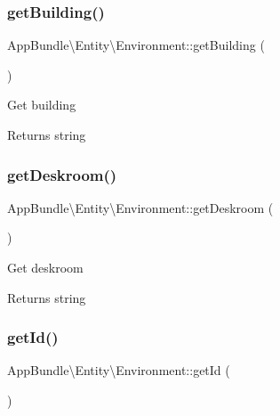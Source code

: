 \subsubsection{\texorpdfstring{get\+Building()}{getBuilding()}}
{\footnotesize\ttfamily App\+Bundle\textbackslash{}\+Entity\textbackslash{}\+Environment\+::get\+Building (\begin{DoxyParamCaption}{ }\end{DoxyParamCaption})}

Get building

\begin{DoxyReturn}{Returns}
string 
\end{DoxyReturn}
\mbox{\label{class_app_bundle_1_1_entity_1_1_environment_a788745e2b9c4d44ff9c9cb5503e67a30}} 
\subsubsection{\texorpdfstring{get\+Deskroom()}{getDeskroom()}}
{\footnotesize\ttfamily App\+Bundle\textbackslash{}\+Entity\textbackslash{}\+Environment\+::get\+Deskroom (\begin{DoxyParamCaption}{ }\end{DoxyParamCaption})}

Get deskroom

\begin{DoxyReturn}{Returns}
string 
\end{DoxyReturn}
\mbox{\label{class_app_bundle_1_1_entity_1_1_environment_a64c10b203ad4c23205d9f53ec7f66e63}} 
\subsubsection{\texorpdfstring{get\+Id()}{getId()}}
{\footnotesize\ttfamily App\+Bundle\textbackslash{}\+Entity\textbackslash{}\+Environment\+::get\+Id (\begin{DoxyParamCaption}{ }\end{DoxyParamCaption})}

